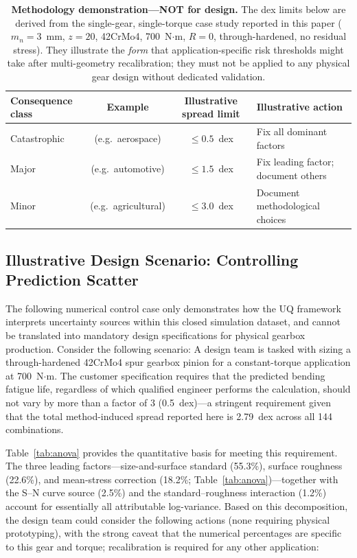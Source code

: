 \documentclass[twocolumn,12pt,a4paper]{article}
\begin{document}
\begin{table}[ht]
\centering
\caption{\textbf{Methodology demonstration---NOT for design.} The dex limits
below are derived from the single-gear, single-torque case study
reported in this paper ($m_n=3$~mm, $z=20$, 42CrMo4, 700~N$\cdot$m,
$R=0$, through-hardened, no residual stress). They illustrate the
\emph{form} that application-specific risk thresholds might take after
multi-geometry recalibration; they must not be applied to any physical
gear design without dedicated validation.
\label{tab:risk_thresholds}}
\footnotesize
\begin{tabular}{lccp{2.3cm}}
\toprule
Consequence class & Example & Illustrative spread limit & Illustrative action \\
\midrule
Catastrophic & (e.g.\ aerospace) & $\leq 0.5$~dex & Fix all dominant factors \\
Major & (e.g.\ automotive) & $\leq 1.5$~dex & Fix leading factor; document others \\
Minor & (e.g.\ agricultural) & $\leq 3.0$~dex & Document methodological choices \\
\bottomrule
\end{tabular}
\end{table}

\subsection{Illustrative Design Scenario: Controlling Prediction Scatter}

The following numerical control case only demonstrates how the UQ
framework interprets uncertainty sources within this closed simulation
dataset, and cannot be translated into mandatory design specifications
for physical gearbox production. Consider the following scenario: A
design team is tasked with sizing a through-hardened 42CrMo4 spur
gearbox pinion for a constant-torque application at 700~N$\cdot$m.
The customer specification requires that the predicted bending fatigue
life, regardless of which qualified engineer performs the calculation,
should not vary by more than a factor of 3 (0.5~dex)---a stringent
requirement given that the total method-induced spread reported here is
2.79~dex across all 144 combinations.

Table~\ref{tab:anova} provides the quantitative basis for meeting this
requirement. The three leading factors---size-and-surface standard (55.3\%),
surface roughness (22.6\%), and mean-stress correction (18.2\%;
Table~\ref{tab:anova})---together with the S--N curve source (2.5\%)
and the standard--roughness interaction (1.2\%) account for
essentially all attributable log-variance. Based on this decomposition, the design team could
consider the following actions (none requiring physical prototyping),
with the strong caveat that the numerical percentages are specific
to this gear and torque; recalibration is required for any other
application:
\end{document}
